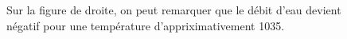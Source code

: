 \begin{figure}[htb!]
	\centering
	\caption{Sur la figure de droite, on peut remarquer que le débit d'eau devient
	négatif pour une température d'appriximativement \unit{1035}{\kelvin}.}
	\label{fig:etude-h2o}
\end{figure}


